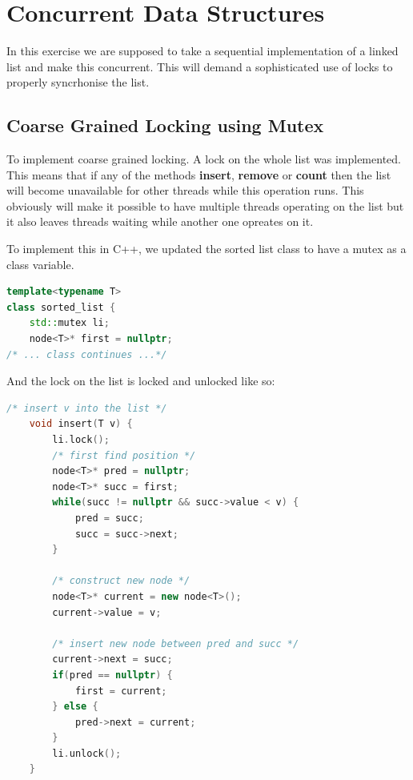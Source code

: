 \section{Concurrent Data Structures}

In this exercise we are supposed to take a sequential implementation of a 
linked list and make this concurrent. This will demand a sophisticated use of
locks to properly syncrhonise the list.

\subsection{Coarse Grained Locking using Mutex}

To implement coarse grained locking. A lock on the whole list was implemented.
This means that if any of the methods \textbf{insert}, \textbf{remove} or 
\textbf{count} then the list will become unavailable for other threads while 
this operation runs. This obviously will make it possible to have multiple 
threads operating on the list but it also leaves threads waiting while another 
one opreates on it.

To implement this in C++, we updated the sorted list class to have a mutex as a
class variable.

\begin{lstlisting}[language=C++]
template<typename T>
class sorted_list {
	std::mutex li;
	node<T>* first = nullptr;
/* ... class continues ...*/
\end{lstlisting}

And the lock on the list is locked and unlocked like so:

\begin{lstlisting}[language=C++, caption=Coarse-Grained Insert]
    /* insert v into the list */
    void insert(T v) {
        li.lock();
        /* first find position */
        node<T>* pred = nullptr;
        node<T>* succ = first;
        while(succ != nullptr && succ->value < v) {
            pred = succ;
            succ = succ->next;
        }
        
        /* construct new node */
        node<T>* current = new node<T>();
        current->value = v;
    
        /* insert new node between pred and succ */
        current->next = succ;
        if(pred == nullptr) {
            first = current;
        } else {
            pred->next = current;
        }
        li.unlock();
    }
\end{lstlisting}

